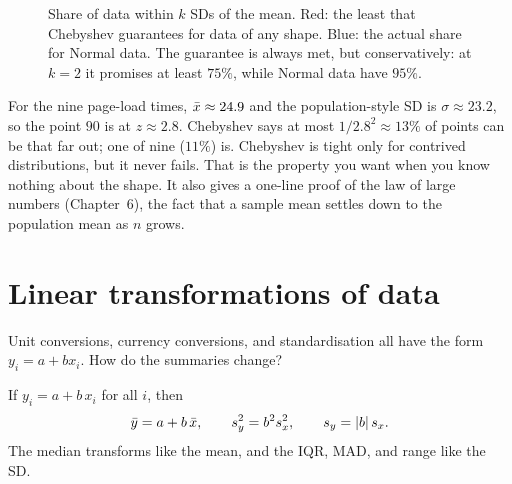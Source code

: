 \begin{figure}[H]
\centering
{}
\caption{Share of data within $k$ SDs of the mean. Red: the least that Chebyshev
guarantees for data of any shape. Blue: the actual share for Normal data. The
guarantee is always met, but conservatively: at $k=2$ it promises at least $75\%$,
while Normal data have $95\%$.}
\label{fig:center-spread-chebyshev}
\end{figure}

For the nine page-load times, $\bar{x} \approx 24.9$ and the population-style SD is
$\sigma \approx 23.2$, so the point $90$ is at $z \approx 2.8$. Chebyshev says at most
$1/2.8^2 \approx 13\%$ of points can be that far out; one of nine ($11\%$) is.
Chebyshev is tight only for contrived distributions, but it never fails. That is the
property you want when you know nothing about the shape. It also gives a one-line
proof of the law of large numbers (Chapter~6), the fact that a sample mean settles
down to the population mean as $n$ grows.

\section{Linear transformations of data}
\label{sec:center-spread-linear}

Unit conversions, currency conversions, and standardisation all have the form
$y_i = a + b x_i$. How do the summaries change?

\begin{theorem}
If $y_i = a + b\,x_i$ for all $i$, then
\[
  \bar{y} = a + b\,\bar{x}, \qquad s_y^2 = b^2 s_x^2, \qquad s_y = \lvert b\rvert\, s_x .
\]
The median transforms like the mean, and the IQR, MAD, and range like the SD.
\end{theorem}

